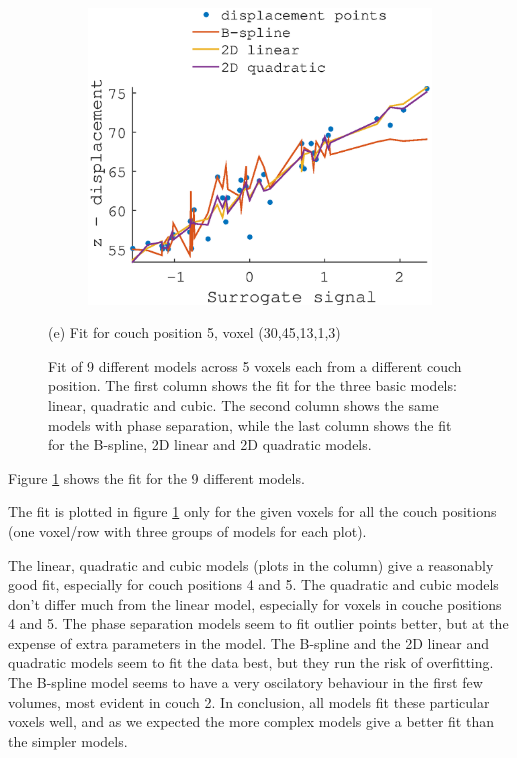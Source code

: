 \documentclass[11pt,a4paper,oneside]{report}
\begin{document}
\begin{figure}[H]
\begin{subfigure}[b]{0.33\textwidth}
  \end{subfigure}
    ~ %
  \begin{subfigure}[b]{0.33\textwidth}
    \includegraphics[width=\textwidth, trim=0 0 0 110,clip=true]{figures/task2/fit_round3_couch5.eps}
  \end{subfigure}
  (e) Fit for couch position 5, voxel (30,45,13,1,3)
  \vspace*{1em}

  
  \caption{Fit of 9 different models across 5 voxels each from a different couch position. The first column shows the fit for the three basic models: linear, quadratic and cubic. The second column shows the same models with phase separation, while the last column shows the fit for the B-spline, 2D linear and 2D quadratic models.}
  \label{fig:c2fit}
  
\end{figure}

Figure \ref{fig:c2fit} shows the fit for the 9 different models.


The fit is plotted in figure \ref{fig:c2fit} only for the given voxels for all the couch positions (one voxel/row with three groups of models for each plot).

The linear, quadratic and cubic models (plots in the column) give a reasonably good fit, especially for couch positions 4 and 5. The quadratic and cubic models don't differ much from the linear model, especially for voxels in couche positions 4 and 5. The phase separation models seem to fit outlier points better, but at the expense of extra parameters in the model. The B-spline and the 2D linear and quadratic models seem to fit the data best, but they run the risk of overfitting. The B-spline model seems to have a very oscilatory behaviour in the first few volumes, most evident in couch 2. In conclusion, all models fit these particular voxels well, and as we expected the more complex models give a better fit than the simpler models.
\end{document}
